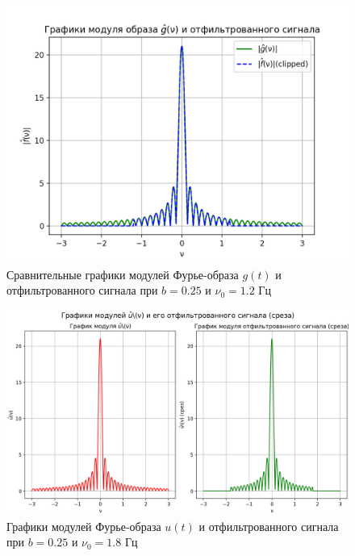 \begin{figure}[ht!]
    \centering
    \includegraphics[scale=0.55]{media/1 task/high_freq/Fourier_Image_Comparison_0,25_-1,1981981981981982.png}
    \caption{Сравнительные графики модулей Фурье-образа $g(t)$ и отфильтрованного сигнала при $b=0.25$ и $\nu_0=1.2$ Гц}
    \label{fig:fourc_025_12}
\end{figure}

\clearpage

\begin{figure}[ht!]
    \centering
    \includegraphics[scale=0.55]{media/1 task/high_freq/Fourier_Image_0,25_-1,7987987987987988.png}
    \caption{Графики модулей Фурье-образа $u(t)$ и отфильтрованного сигнала при $b=0.25$ и $\nu_0=1.8$ Гц}
    \label{fig:four_025_18}
\end{figure}

